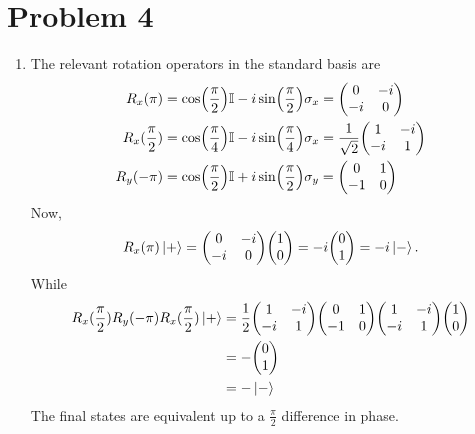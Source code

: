 \documentclass[12pt]{article}
\begin{document}
\section*{Problem 4}
\begin{enumerate}[label=(\alph*)]
    \item The relevant rotation operators in the standard basis are
    \begin{align*}
        R_x(\pi) &= \cos(\frac{\pi}{2})\mathbb{I} - i\sin(\frac{\pi}{2})\sigma_x = \mqty(0&-i\\-i&0) \\
        R_x(\frac{\pi}{2}) &= \cos(\frac{\pi}{4})\mathbb{I} - i\sin(\frac{\pi}{4})\sigma_x = \frac{1}{\sqrt{2}}\mqty(1&-i\\-i&1) \\
        R_y(-\pi) &= \cos(\frac{\pi}{2})\mathbb{I} + i\sin(\frac{\pi}{2})\sigma_y = \mqty(0&1\\-1&0)
    \end{align*}
    Now,
    \[ R_x(\pi)\ket{+} = \mqty(0&-i\\-i&0)\mqty(1\\0) = -i\mqty(0\\1) = -i\ket{-}. \]
    While
    \begin{align*}
        R_x(\frac{\pi}{2})R_y(-\pi)R_x(\frac{\pi}{2})\ket{+} &= \frac{1}{2}\mqty(1&-i\\-i&1)\mqty(0&1\\-1&0)\mqty(1&-i\\-i&1)\mqty(1\\0) \\
        &= -\mqty(0\\1) \\
        &= -\ket{-}
    \end{align*}
    The final states are equivalent up to a $\frac{\pi}{2}$ difference in phase.


\end{enumerate}
\end{document}
